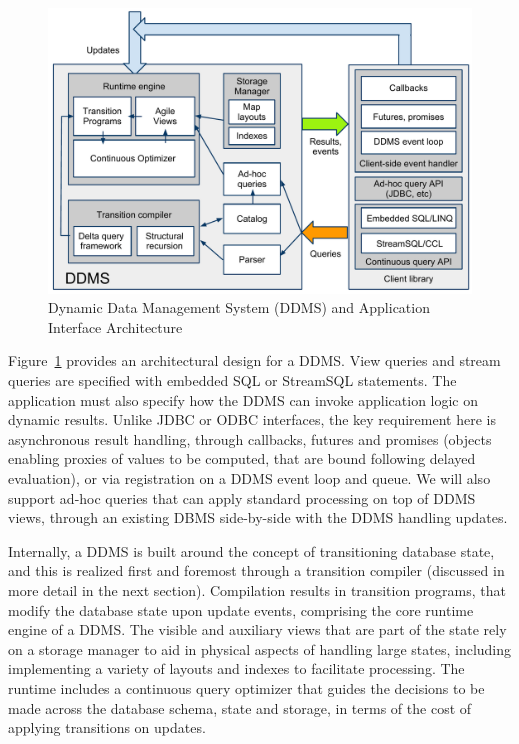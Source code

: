 \begin{figure}
\begin{center}
\includegraphics[scale=0.35]{graphics/CIDRarch.pdf}
\end{center}
\caption{Dynamic Data Management System (DDMS) and Application Interface
Architecture}
\label{fig:ddmsarch}
\end{figure}


Figure~\ref{fig:ddmsarch} provides an architectural design for a DDMS. View
queries and stream queries are specified with embedded SQL or StreamSQL
statements. The application must also specify how the DDMS can invoke
application logic on dynamic results. Unlike JDBC or ODBC interfaces, the key
requirement here is asynchronous result handling, through callbacks, futures and
promises (objects enabling proxies of values to be computed, that are bound
following delayed evaluation), or via registration on a DDMS event loop and
queue. We will also support ad-hoc queries that can apply standard processing on
top of DDMS views, through an existing DBMS side-by-side with the DDMS handling
updates.



Internally, a DDMS is built around the concept of transitioning database state,
and this is realized first and foremost through a transition compiler (discussed
in more detail in the next section). Compilation results in transition programs,
that modify the database state upon update events, comprising the core runtime
engine of a DDMS. The visible and auxiliary views that are part of the state
rely on a storage manager to aid in physical aspects of handling large states,
including implementing a variety of layouts and indexes to facilitate
processing. The runtime includes a continuous query optimizer that guides the
decisions to be made across the database schema, state and storage, in terms of
the cost of applying transitions on updates.




